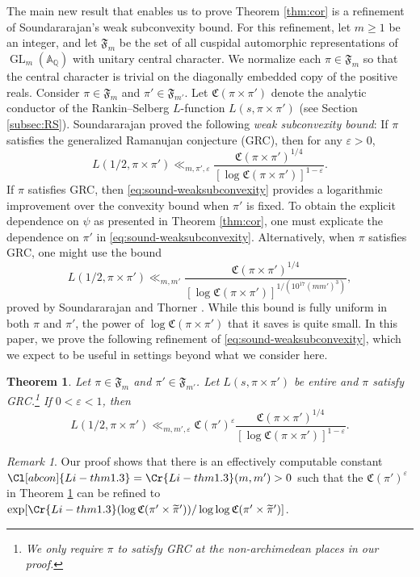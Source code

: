 \documentclass[12pt,reqno]{amsart}
\newtheorem{thm}{Theorem}[section]
\theoremstyle{remark}
\newtheorem*{rek}{Remark}
\DeclareMathOperator{\GL}{GL}
\numberwithin{equation}{section}
\begin{document}
    The main new result that enables us to prove Theorem \ref{thm:cor}  is a refinement of Soundararajan's weak subconvexity bound. For this refinement, let $m \ge 1$ be an integer, and let $\mathfrak{F}_{m}$ be the set of all cuspidal automorphic representations of $\GL_m(\mathbb{A}_{\mathbb{Q}})$ with unitary central character. We normalize each $\pi\in\mathfrak{F}_m$ so that the central character is  trivial on the diagonally embedded copy of the positive reals. Consider $\pi \in \mathfrak{F}_{m}$ and $\pi' \in \mathfrak{F}_{m'}$.  Let $\mathfrak{C}(\pi\times\pi')$ denote the analytic conductor of the Rankin--Selberg $L$-function $L(s,\pi\times\pi')$ (see Section \ref{subsec:RS}). 
    Soundararajan \cite{S} proved the following {\it weak subconvexity bound}:  If $\pi$ satisfies the generalized Ramanujan conjecture (GRC), then for any $\varepsilon > 0$,
    \begin{equation}
	\label{eq:sound-weaksubconvexity}
            L(1/2, \pi \times \pi') \ll_{ m, \pi', \varepsilon} \frac{\mathfrak{C}(\pi\times \pi')^{1/4}}{[\log \mathfrak{C}(\pi\times \pi')]^{1-\varepsilon}}.
    \end{equation}
    If $\pi$ satisfies GRC, then \eqref{eq:sound-weaksubconvexity} provides a logarithmic improvement over the convexity bound
    when $\pi'$ is fixed. To obtain the explicit dependence on $\psi$ as presented in Theorem \ref{thm:cor}, one must explicate the dependence on $\pi'$  in \eqref{eq:sound-weaksubconvexity}. Alternatively, when $\pi$ satisfies GRC, one might use the bound
	\[
            L(1/2,\pi\times\pi')\ll_{m,m'}\frac{\mathfrak{C}(\pi\times\pi')^{1/4}}{[\log \mathfrak{C}(\pi\times\pi')]^{1/(10^{17}(mm')^3)}},
	\]
    proved by Soundararajan and Thorner \cite{ST}.  While this bound is fully uniform in both $\pi$ and $\pi'$, the power of $\log \mathfrak{C}(\pi\times\pi')$ that it saves is quite small.  In this paper, we prove the following refinement of \eqref{eq:sound-weaksubconvexity}, which we expect to be useful in settings beyond what we consider here.
	
    \begin{thm}
    \label{thm:weaksub}
        Let $\pi \in \mathfrak{F}_{m}$ and $\pi' \in \mathfrak{F}_{m'}$. Let $L(s,\pi\times\pi')$ be entire and $\pi$ satisfy GRC.\footnote{We only require $\pi$ to satisfy GRC at the non-archimedean places in our proof.}
        If $0<\varepsilon<1$, then 
		\begin{equation*}
                L(1/2, \pi\times\pi') \ll_{m,m',\varepsilon} \mathfrak{C}(\pi')^{\varepsilon} \frac{\mathfrak{C}(\pi\times\pi')^{1/4}}{[\log \mathfrak{C}(\pi\times\pi')]^{1-\varepsilon}}.
		\end{equation*}
    \end{thm}
    \begin{rek}
        Our proof shows that there is an effectively computable constant $\Cl[abcon]{Li-thm1.3}=\Cr{Li-thm1.3}(m,m')>0$ such that the $\mathfrak{C}(\pi')^{\varepsilon}$ in Theorem \ref{thm:weaksub} can be refined to $\exp[\Cr{Li-thm1.3}(\log \mathfrak{C}(\pi'\times\widetilde{\pi}'))/\log\log \mathfrak{C}(\pi'\times\widetilde{\pi}')]$.
    \end{rek}
\end{document}
